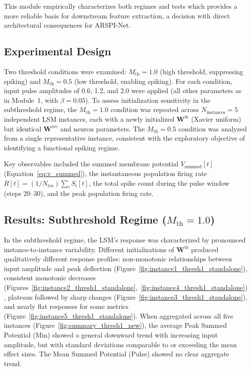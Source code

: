 This module empirically characterizes both regimes and tests which provides a more reliable basis for downstream feature extraction, a decision with direct architectural consequences for ARSPI-Net.

\subsection{Experimental Design}

Two threshold conditions were examined: $M_{\text{th}} = 1.0$ (high threshold, suppressing spiking) and $M_{\text{th}} = 0.5$ (low threshold, enabling spiking). For each condition, input pulse amplitudes of 0.6, 1.2, and 2.0 were applied (all other parameters as in Module~1, with $\beta = 0.05$). To assess initialization sensitivity in the subthreshold regime, the $M_{\text{th}} = 1.0$ condition was repeated across $N_{\text{instances}} = 5$ independent LSM instances, each with a newly initialized $\mathbf{W}^{\text{in}}$ (Xavier uniform) but identical $\mathbf{W}^{\text{rec}}$ and neuron parameters. The $M_{\text{th}} = 0.5$ condition was analyzed from a single representative instance, consistent with the exploratory objective of identifying a functional spiking regime.

Key observables included the summed membrane potential $V_{\text{summed}}[t]$ (Equation~\ref{eq:v_summed}), the instantaneous population firing rate $R[t] = (1/N_{\text{res}}) \sum_i S_i[t]$, the total spike count during the pulse window (steps 20--30), and the peak population firing rate.

\subsection{Results: Subthreshold Regime ($M_{\text{th}} = 1.0$)}
\label{sec:subthreshold_results}

In the subthreshold regime, the LSM's response was characterized by pronounced instance-to-instance variability. Different initializations of $\mathbf{W}^{\text{in}}$ produced qualitatively different response profiles: non-monotonic relationships between input amplitude and peak deflection (Figure~\ref{fig:instance1_thresh1_standalone}), consistent monotonic decreases (Figures~\ref{fig:instance2_thresh1_standalone},~\ref{fig:instance4_thresh1_standalone}), plateaus followed by sharp changes (Figure~\ref{fig:instance3_thresh1_standalone}), and nearly flat responses for some metrics (Figure~\ref{fig:instance5_thresh1_standalone}). When aggregated across all five instances (Figure~\ref{fig:summary_thresh1_new}), the average Peak Summed Potential (Min) showed a general downward trend with increasing input amplitude, but with standard deviations comparable to or exceeding the mean effect sizes. The Mean Summed Potential (Pulse) showed no clear aggregate trend.

